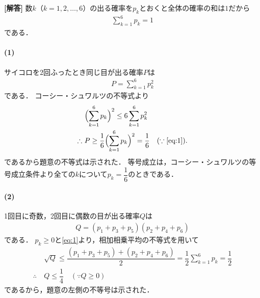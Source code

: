 \documentclass[../../main.tex]{subfiles}
\begin{document}
\begin{oframed}
  
\end{oframed}

{\bf [解答]}
数$k$（$k=1,2,\dots,6$）の出る確率を$p_k$とおくと全体の確率の和は$1$だから
\begin{align}
  \sum_{k=1}^6p_k=1 \label{eq:1}
\end{align}
である．

\paragraph{(1)}

サイコロを$2$回ふったとき同じ目が出る確率$P$は
\begin{align}
  P=\displaystyle\sum_{k=1}^6p_k^2
\end{align}
である．
コーシー・シュワルツの不等式より
\begin{align}
  & \Bigl(\sum_{k=1}^6p_k\Bigr)^2\le6\sum_{k=1}^6p_k^2 \\
  \therefore\
  & P\ge\dfrac{1}{6}\Bigl(\sum_{k=1}^6p_k\Bigr)^2=\dfrac{1}{6} \quad(\because\text{\cref{eq:1}}).
\end{align}
であるから題意の不等式は示された．
等号成立は，コーシー・シュワルツの等号成立条件より全ての$k$について$p_k=\dfrac{1}{6}$のときである．

\paragraph{(2)}

1回目に奇数，2回目に偶数の目が出る確率$Q$は
\begin{align}
  Q=(p_1+p_3+p_5)(p_2+p_4+p_6)
\end{align}
である．
$p_k\ge0$と\cref{eq:1}より，相加相乗平均の不等式を用いて
\begin{align}
  &\sqrt{Q}\le\dfrac{(p_1+p_3+p_5)+(p_2+p_4+p_6)}{2}=\dfrac{1}{2}\sum_{k=1}^6p_k = \dfrac{1}{2} \\
  \therefore\
  & Q\le\dfrac{1}{4}\quad(\because Q\ge 0) \label{eq:2}
\end{align}
であるから，題意の左側の不等号は示された．
\end{document}
